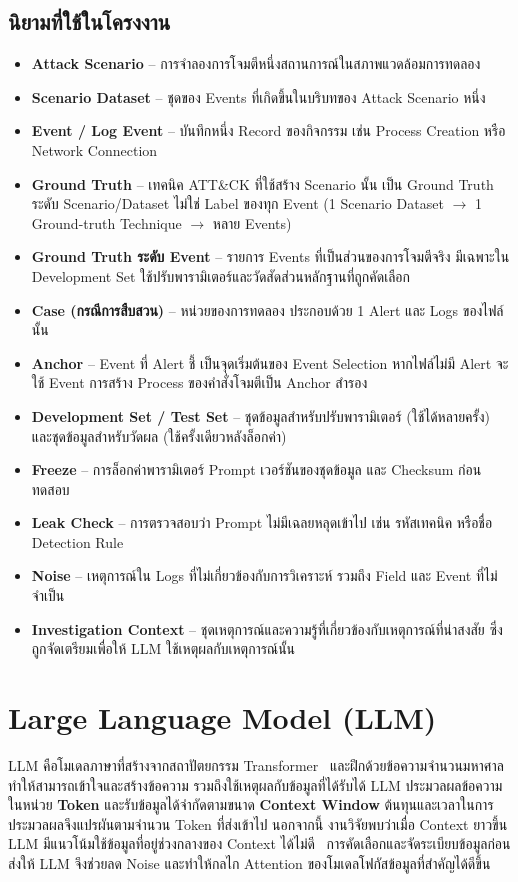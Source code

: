 \subsection{นิยามที่ใช้ในโครงงาน}
\begin{itemize}
  \item \textbf{Attack Scenario} -- การจำลองการโจมตีหนึ่งสถานการณ์ในสภาพแวดล้อมการทดลอง
  \item \textbf{Scenario Dataset} -- ชุดของ Events ที่เกิดขึ้นในบริบทของ Attack Scenario หนึ่ง
  \item \textbf{Event / Log Event} -- บันทึกหนึ่ง Record ของกิจกรรม เช่น Process Creation หรือ Network Connection
  \item \textbf{Ground Truth} -- เทคนิค ATT\&CK ที่ใช้สร้าง Scenario นั้น
        เป็น Ground Truth ระดับ Scenario/Dataset ไม่ใช่ Label ของทุก Event
        (1 Scenario Dataset $\rightarrow$ 1 Ground-truth Technique $\rightarrow$ หลาย Events)
  \item \textbf{Ground Truth ระดับ Event} -- รายการ Events ที่เป็นส่วนของการโจมตีจริง
        มีเฉพาะใน Development Set ใช้ปรับพารามิเตอร์และวัดสัดส่วนหลักฐานที่ถูกคัดเลือก
  \item \textbf{Case (กรณีการสืบสวน)} -- หน่วยของการทดลอง ประกอบด้วย 1 Alert และ Logs ของไฟล์นั้น
  \item \textbf{Anchor} -- Event ที่ Alert ชี้ เป็นจุดเริ่มต้นของ Event Selection
        หากไฟล์ไม่มี Alert จะใช้ Event การสร้าง Process ของคำสั่งโจมตีเป็น Anchor สำรอง
  \item \textbf{Development Set / Test Set} -- ชุดข้อมูลสำหรับปรับพารามิเตอร์ (ใช้ได้หลายครั้ง)
        และชุดข้อมูลสำหรับวัดผล (ใช้ครั้งเดียวหลังล็อกค่า)
  \item \textbf{Freeze} -- การล็อกค่าพารามิเตอร์ Prompt เวอร์ชันของชุดข้อมูล และ Checksum ก่อนทดสอบ
  \item \textbf{Leak Check} -- การตรวจสอบว่า Prompt ไม่มีเฉลยหลุดเข้าไป เช่น รหัสเทคนิค หรือชื่อ Detection Rule
  \item \textbf{Noise} -- เหตุการณ์ใน Logs ที่ไม่เกี่ยวข้องกับการวิเคราะห์ รวมถึง Field และ Event ที่ไม่จำเป็น
  \item \textbf{Investigation Context} -- ชุดเหตุการณ์และความรู้ที่เกี่ยวข้องกับเหตุการณ์ที่น่าสงสัย
        ซึ่งถูกจัดเตรียมเพื่อให้ LLM ใช้เหตุผลกับเหตุการณ์นั้น
\end{itemize}

\section{Large Language Model (LLM)}
LLM คือโมเดลภาษาที่สร้างจากสถาปัตยกรรม Transformer~\cite{vaswani2017attention}
และฝึกด้วยข้อความจำนวนมหาศาล ทำให้สามารถเข้าใจและสร้างข้อความ รวมถึงใช้เหตุผลกับข้อมูลที่ได้รับได้
LLM ประมวลผลข้อความในหน่วย \textbf{Token} และรับข้อมูลได้จำกัดตามขนาด \textbf{Context Window}
ต้นทุนและเวลาในการประมวลผลจึงแปรผันตามจำนวน Token ที่ส่งเข้าไป
นอกจากนี้ งานวิจัยพบว่าเมื่อ Context ยาวขึ้น LLM มีแนวโน้มใช้ข้อมูลที่อยู่ช่วงกลางของ Context ได้ไม่ดี~\cite{liu2024lost}
การคัดเลือกและจัดระเบียบข้อมูลก่อนส่งให้ LLM จึงช่วยลด Noise และทำให้กลไก Attention ของโมเดลโฟกัสข้อมูลที่สำคัญได้ดีขึ้น

